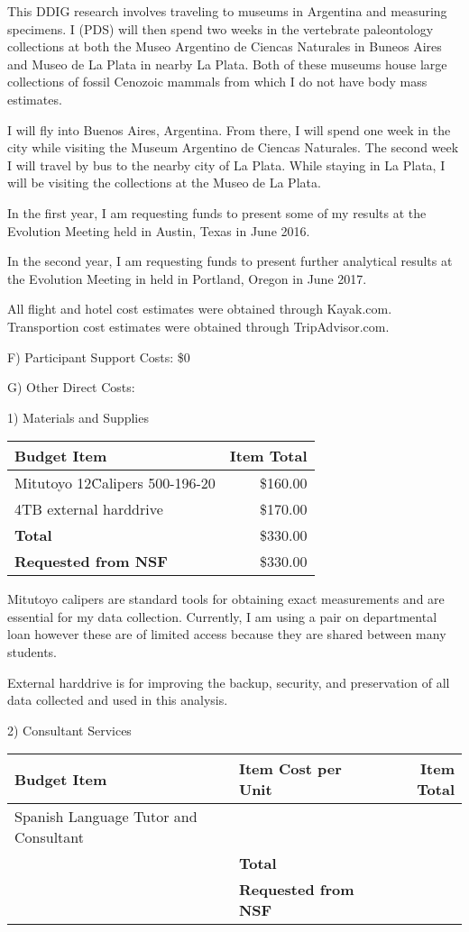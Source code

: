 \documentclass[11pt,letterpaper]{article}
\begin{document}
This DDIG research involves traveling to museums in Argentina and measuring specimens. I (PDS) will then spend two weeks in the vertebrate paleontology collections at both the Museo Argentino de Ciencas Naturales in Buneos Aires and Museo de La Plata in nearby La Plata. Both of these museums house large collections of fossil Cenozoic mammals from which I do not have body mass estimates.

I will fly into Buenos Aires, Argentina. From there, I will spend one week in the city while visiting the Museum Argentino de Ciencas Naturales. The second week I will travel by bus to the nearby city of La Plata. While staying in La Plata, I will be visiting the collections at the Museo de La Plata. 

In the first year, I am requesting funds to present some of my results at the Evolution Meeting held in Austin, Texas in June 2016.

In the second year, I am requesting funds to present further analytical results at the Evolution Meeting in held in Portland, Oregon in June 2017.

All flight and hotel cost estimates were obtained through Kayak.com. Transportion cost estimates were obtained through TripAdvisor.com.


F) Participant Support Costs: \$0

G) Other Direct Costs:

1) Materials and Supplies

\begin{tabular}[H]{l r}
  Budget Item & Item Total \\
  \hline
  Mitutoyo 12\" Calipers 500-196-20 & \$160.00 \\
  4TB external harddrive & \$170.00 \\
  \textbf{Total} & \$330.00 \\
  \textbf{Requested from NSF} & \$330.00
\end{tabular}

Mitutoyo calipers are standard tools for obtaining exact measurements and are essential for my data collection. Currently, I am using a pair on departmental loan however these are of limited access because they are shared between many students. 

External harddrive is for improving the backup, security, and preservation of all data collected and used in this analysis.




2) Consultant Services

\begin{tabular}[H]{l l r}
  Budget Item & Item Cost per Unit & Item Total \\
  \hline
  Spanish Language Tutor and Consultant & \\
  & \textbf{Total} & \\
  & \textbf{Requested from NSF} & 
\end{tabular}
\end{document}
